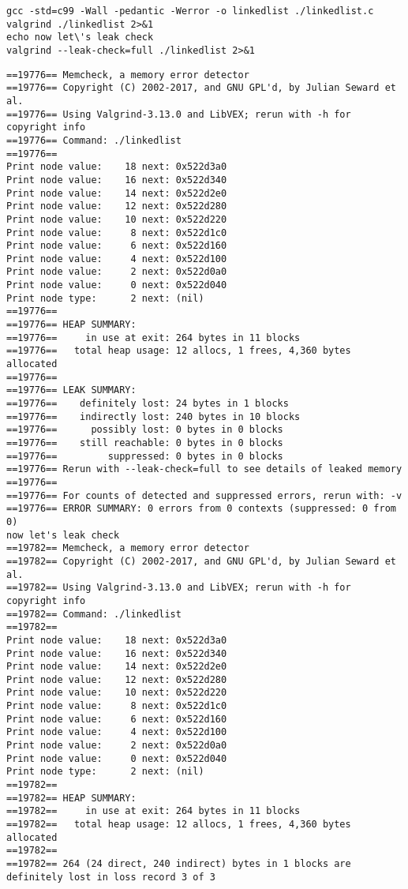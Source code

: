 \documentclass[11pt]{article}
\begin{document}
\begin{verbatim}
gcc -std=c99 -Wall -pedantic -Werror -o linkedlist ./linkedlist.c
valgrind ./linkedlist 2>&1
echo now let\'s leak check
valgrind --leak-check=full ./linkedlist 2>&1
\end{verbatim}

\begin{verbatim}
==19776== Memcheck, a memory error detector
==19776== Copyright (C) 2002-2017, and GNU GPL'd, by Julian Seward et al.
==19776== Using Valgrind-3.13.0 and LibVEX; rerun with -h for copyright info
==19776== Command: ./linkedlist
==19776== 
Print node value:    18 next: 0x522d3a0
Print node value:    16 next: 0x522d340
Print node value:    14 next: 0x522d2e0
Print node value:    12 next: 0x522d280
Print node value:    10 next: 0x522d220
Print node value:     8 next: 0x522d1c0
Print node value:     6 next: 0x522d160
Print node value:     4 next: 0x522d100
Print node value:     2 next: 0x522d0a0
Print node value:     0 next: 0x522d040
Print node type:      2 next: (nil)
==19776== 
==19776== HEAP SUMMARY:
==19776==     in use at exit: 264 bytes in 11 blocks
==19776==   total heap usage: 12 allocs, 1 frees, 4,360 bytes allocated
==19776== 
==19776== LEAK SUMMARY:
==19776==    definitely lost: 24 bytes in 1 blocks
==19776==    indirectly lost: 240 bytes in 10 blocks
==19776==      possibly lost: 0 bytes in 0 blocks
==19776==    still reachable: 0 bytes in 0 blocks
==19776==         suppressed: 0 bytes in 0 blocks
==19776== Rerun with --leak-check=full to see details of leaked memory
==19776== 
==19776== For counts of detected and suppressed errors, rerun with: -v
==19776== ERROR SUMMARY: 0 errors from 0 contexts (suppressed: 0 from 0)
now let's leak check
==19782== Memcheck, a memory error detector
==19782== Copyright (C) 2002-2017, and GNU GPL'd, by Julian Seward et al.
==19782== Using Valgrind-3.13.0 and LibVEX; rerun with -h for copyright info
==19782== Command: ./linkedlist
==19782== 
Print node value:    18 next: 0x522d3a0
Print node value:    16 next: 0x522d340
Print node value:    14 next: 0x522d2e0
Print node value:    12 next: 0x522d280
Print node value:    10 next: 0x522d220
Print node value:     8 next: 0x522d1c0
Print node value:     6 next: 0x522d160
Print node value:     4 next: 0x522d100
Print node value:     2 next: 0x522d0a0
Print node value:     0 next: 0x522d040
Print node type:      2 next: (nil)
==19782== 
==19782== HEAP SUMMARY:
==19782==     in use at exit: 264 bytes in 11 blocks
==19782==   total heap usage: 12 allocs, 1 frees, 4,360 bytes allocated
==19782== 
==19782== 264 (24 direct, 240 indirect) bytes in 1 blocks are definitely lost in loss record 3 of 3

\end{verbatim}
\end{document}

